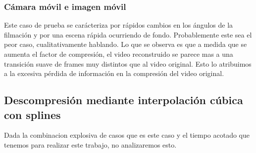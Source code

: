 \subsubsection{Cámara móvil e imagen móvil}
Este caso de prueba se carácteriza por rápidos cambios en los ángulos de la filmación y por una escena rápida ocurriendo de fondo. Probablemente este sea el peor caso, cualitativamente hablando. Lo que se observa es que a medida que se aumenta el factor de compresión, el video reconstruido se parece mas a una transición suave de frames muy distintos que al video original. Esto lo atribuimos a la excesiva pérdida de información en la compresión del video original. 

\subsection{Descompresión mediante interpolación cúbica con splines}
Dada la combinacion explosiva de casos que es este caso y el tiempo acotado que tenemos para realizar este trabajo, no analizaremos esto.

